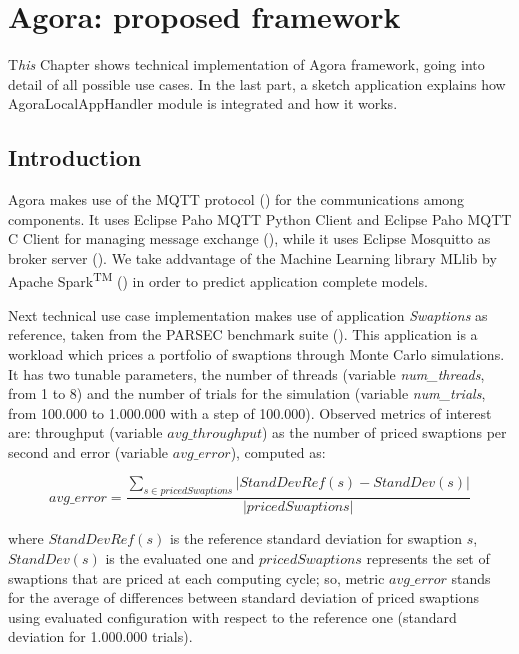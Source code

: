 \chapter{Agora: proposed framework}\label{agora}

\lettrine{T}{}\textit{his} Chapter shows technical implementation of Agora framework, going into detail of all possible use cases. In the last part, a sketch application explains how AgoraLocalAppHandler module is integrated and how it works.


\section{Introduction}

Agora makes use of the MQTT protocol (\cite{banks2014mqtt}) for the communications among components. It uses Eclipse Paho MQTT Python Client and Eclipse Paho MQTT C Client for managing message exchange (\cite{o2014paho}), while it uses Eclipse Mos\-quitto as broker server (\cite{light2013mosquitto}). We take addvantage of the Machine Learning library MLlib by Apache Spark\textsuperscript{TM} (\cite{spark2015apache}) in order to predict application complete models.

Next technical use case implementation makes use of application \textit{Swaptions} as reference, taken from the PARSEC benchmark suite (\cite{bienia2008parsec}). This application is a workload which prices a portfolio of swaptions through Monte Carlo simulations. It has two tunable parameters, the number of threads (variable \textit{num\_threads}, from 1 to 8) and the number of trials for the simulation (variable \textit{num\_trials}, from 100.000 to 1.000.000 with a step of 100.000). Observed metrics of interest are: throughput (variable $avg\_throughput$) as the number of priced swaptions per second and error (variable $avg\_error$), computed as:

\[
avg\_error = \dfrac{\sum_{s \in pricedSwaptions} \left\vert StandDevRef(s) - StandDev(s) \right\vert}{\left\vert pricedSwaptions \right\vert}
\]

where $StandDevRef(s)$ is the reference standard deviation for swaption $s$, $StandDev(s)$ is the evaluated one and $pricedSwaptions$ represents the set of swaptions that are priced at each computing cycle; so, metric $avg\_error$ stands for the average of differences between standard deviation of priced swaptions using evaluated configuration with respect to the reference one (standard deviation for 1.000.000 trials).

